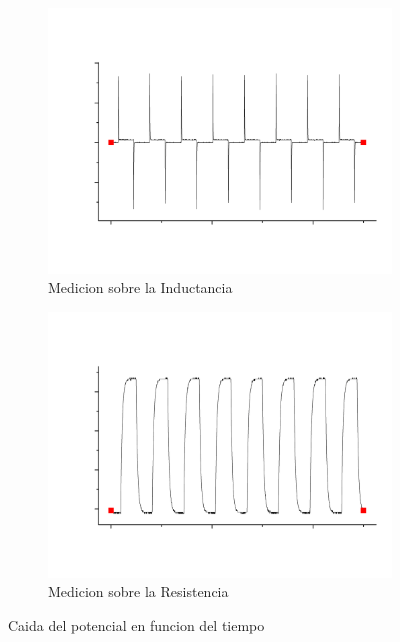 \documentclass[11pt,a4paper]{article}
\begin{document}
\begin{figure}[H]

\begin{subfigure}{0.5\textwidth}
\includegraphics[scale=0.30]{RL-Caida_en_Inductancia}
  \caption{Medicion sobre la Inductancia}
  \label{subfig:RL_CI}
\end{subfigure}
\begin{subfigure}{0.5\textwidth}
\includegraphics[scale=0.30]{RL-Caida_en_Resistencia}
  \caption{Medicion sobre la Resistencia}
  \label{subfig:RL_CR}
\end{subfigure}
  \caption{Caida del potencial en funcion del tiempo}
  \label{fig:RL_C}
\end{figure}
\end{document}
